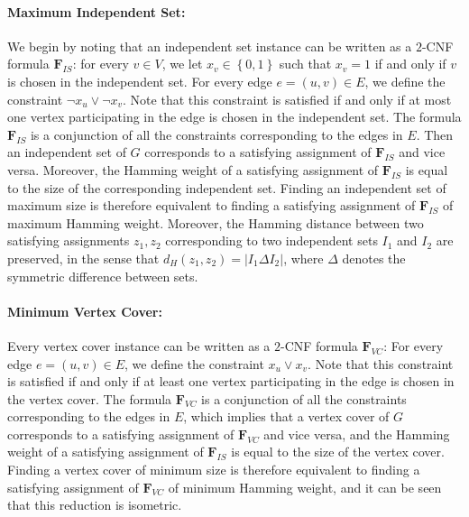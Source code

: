 \documentclass[11pt, letterpaper]{article}
\theoremstyle{definition}
\newcommand{\set}[1]{\left \{ #1 \right \}}
\newcommand{\f}{\mathbf{F}}
\begin{document}
\paragraph{Maximum Independent Set: }We begin by noting that an independent set instance can be written as a $2$-CNF formula $\f_{IS}$: for every $v\in V$, we let $x_v \in\set{0,1}$ such that $x_v=1$ if and only if $v$ is chosen in the independent set. For every edge $e = (u,v) \in E$, we define the constraint $\neg x_u \vee \neg x_v $. Note that this constraint is satisfied if and only if at most one vertex participating in the edge is chosen in the independent set. The formula $\f_{IS}$ is a conjunction of all the constraints corresponding to the edges in $E$. Then an independent set of $G$ corresponds to a satisfying assignment of $\f_{IS}$ and vice versa. Moreover, the Hamming weight of a satisfying assignment of $\f_{IS}$ is equal to the size of the corresponding independent set. Finding an independent set of maximum size is therefore equivalent to finding a satisfying assignment of $\f_{IS}$ of maximum Hamming weight. Moreover, the Hamming distance between two satisfying assignments $z_1,z_2$ corresponding to two independent sets $I_1$ and $I_2$ are preserved, in the sense that $d_H(z_1,z_2) = |I_1\Delta I_2|$, where $\Delta$ denotes the symmetric difference between sets. 

\paragraph{Minimum Vertex Cover: }Every vertex cover instance can be written as a $2$-CNF formula $\f_{VC}$: For every edge $e = (u,v) \in E$, we define the constraint $ x_u \vee x_v $. Note that this constraint is satisfied if and only if at least one vertex participating in the edge is chosen in the vertex cover. The formula $\f_{VC}$ is a conjunction of all the constraints corresponding to the edges in $E$, which implies that a vertex cover of $G$ corresponds to a satisfying assignment of $\f_{VC}$ and vice versa, and the Hamming weight of a satisfying assignment of $\f_{IS}$ is equal to the size of the vertex cover. Finding a vertex cover of minimum size  is therefore equivalent to finding a satisfying assignment of $\f_{VC}$ of minimum Hamming weight, and it can be seen that this reduction is isometric.
\end{document}
